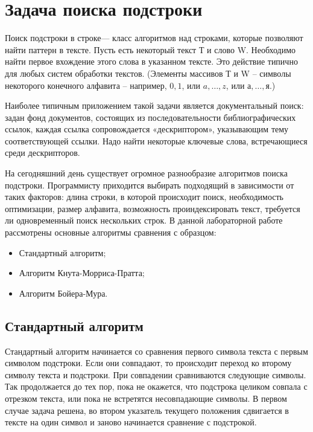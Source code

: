 \documentclass[a4paper,12pt]{report}
\begin{document}
\section{Задача поиска подстроки}

\hspace{0.6cm}Поиск подстроки в строке— класс алгоритмов над строками, которые позволяют найти паттерн в тексте. Пусть есть некоторый текст Т и слово  W. Необходимо найти первое вхождение этого слова в указанном тексте. Это действие типично для любых систем обработки текстов. (Элементы массивов Т и W – символы некоторого конечного алфавита – например, ${0, 1}$, или ${a, …, z}$, или ${а, …, я}$.)

Наиболее типичным приложением такой задачи является документальный поиск: задан фонд документов, состоящих из последовательности библиографических ссылок, каждая ссылка сопровождается «дескриптором», указывающим тему соответствующей ссылки. Надо найти некоторые ключевые слова, встречающиеся среди дескрипторов. 

На сегодняшний день существует огромное разнообразие алгоритмов поиска подстроки. Программисту приходится выбирать подходящий в зависимости от таких факторов: длина строки, в которой происходит поиск, необходимость оптимизации, размер алфавита, возможность проиндексировать текст, требуется ли одновременный поиск нескольких строк.  В данной лабораторной работе рассмотрены основные алгоритмы сравнения с образцом:
\begin{itemize}
\item Стандартный алгоритм;
\item Алгоритм Кнута-Морриса-Пратта;
\item Алгоритм Бойера-Мура.
\end{itemize}

\subsection{Стандартный алгоритм}
\hspace{0.6cm}Стандартный алгоритм начинается со сравнения первого символа текста с первым символом подстроки. Если они совпадают, то происходит переход ко второму символу текста и подстроки. При совпадении сравниваются следующие символы. Так продолжается до тех пор, пока не окажется, что подстрока целиком совпала с отрезком текста, или пока не встретятся несовпадающие символы. В первом случае задача решена, во втором указатель текущего положения сдвигается в тексте на один символ и заново начинается сравнение с подстрокой.
\end{document}

